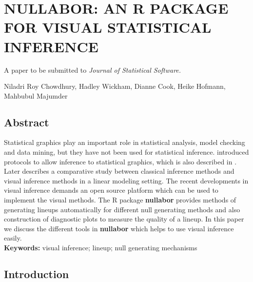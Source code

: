 \chapter{NULLABOR: AN R PACKAGE FOR VISUAL STATISTICAL INFERENCE}\label{ch:nullabor}
\vspace{0.8cm}
\begin{center}
\large{A paper to be submitted to \it{Journal of Statistical Software}.}

\large{Niladri Roy Chowdhury, Hadley Wickham, Dianne Cook, Heike Hofmann, \\
Mahbubul Majumder}\\
\end{center}

\section*{Abstract}

Statistical graphics play an important role in statistical analysis, model checking and data mining, but they have not been used for statistical inference. \cite{buja:2009} introduced protocols to allow inference to statistical graphics, which is also described in \cite{hadley:2010}. Later \cite{majumder:2013} describes a comparative study between classical inference methods and visual inference methods in a linear modeling setting. The recent developments in visual inference demands an open source platform which can be used to implement the visual methods. The R package \textbf{nullabor} provides methods of generating lineups automatically for different null generating methods and also construction of diagnostic plots to measure the quality of a lineup. In this paper we discuss the different tools in \textbf{nullabor} which helps to use visual inference easily.\\



\textbf{Keywords:} visual inference; lineup; null generating mechanisms

\newpage
\section{Introduction}\label{introduction}

